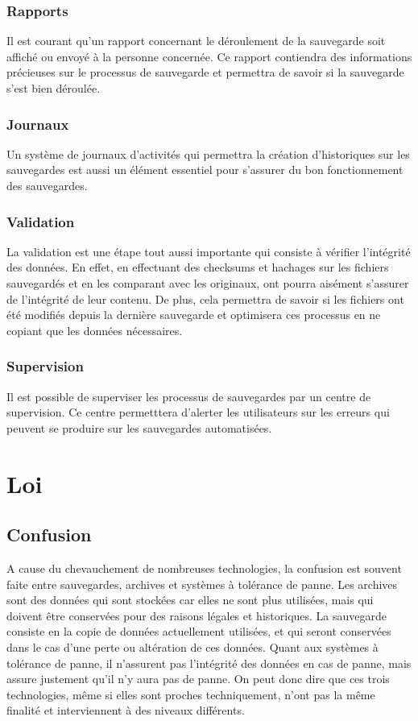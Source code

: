 \documentclass[a4paper,11pt]{report}
\begin{document}
\subsection{Rapports}
Il est courant qu'un rapport concernant le déroulement de la sauvegarde soit affiché ou envoyé à la personne concernée.
Ce rapport contiendra des informations précieuses sur le processus de sauvegarde et permettra de savoir si la sauvegarde s'est bien déroulée.

\subsection{Journaux}
Un système de journaux d'activités qui permettra la création d'historiques sur les sauvegardes est aussi un élément essentiel pour s'assurer du bon fonctionnement des sauvegardes.

\subsection{Validation}
La validation est une étape tout aussi importante qui consiste à vérifier l'intégrité des données. 
En effet, en effectuant des checksums et hachages sur les fichiers sauvegardés et en les comparant avec les originaux, ont pourra aisément s'assurer de l'intégrité de leur contenu.
De plus, cela permettra de savoir si les fichiers ont été modifiés depuis la dernière sauvegarde et optimisera ces processus en ne copiant que les données nécessaires.

\subsection{Supervision}
Il est possible de superviser les processus de sauvegardes par un centre de supervision.
Ce centre permetttera d'alerter les utilisateurs sur les erreurs qui peuvent se produire sur les sauvegardes automatisées.

\chapter{Loi}

\section{Confusion}
A cause du chevauchement de nombreuses technologies, la confusion est souvent faite entre sauvegardes, archives et systèmes à tolérance de panne.
Les archives sont des données qui sont stockées car elles ne sont plus utilisées, mais qui doivent être conservées pour des raisons légales et historiques.
La sauvegarde consiste en  la copie de données actuellement utilisées, et qui seront conservées dans le cas d'une perte ou altération de ces données.
Quant aux systèmes à tolérance de panne, il n'assurent pas l'intégrité des données en cas de panne, mais assure justement qu'il n'y aura pas de panne.
On peut donc dire que ces trois technologies, même si elles sont proches techniquement, n'ont pas la même finalité et interviennent à des niveaux différents.
\end{document}
